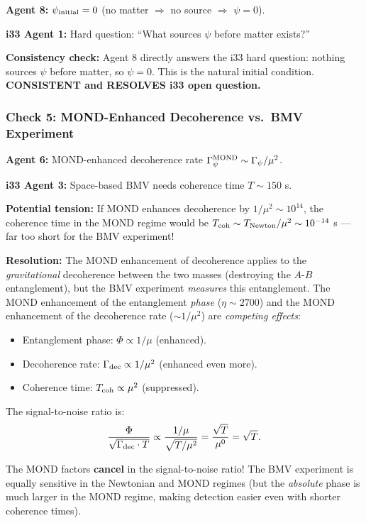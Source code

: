 \documentclass[11pt,a4paper]{article}
\begin{document}
\textbf{Agent 8:} $\psi_{\rm initial} = 0$ (no matter $\Rightarrow$ no source $\Rightarrow$ $\psi = 0$).

\textbf{i33 Agent 1:} Hard question: ``What sources $\psi$ before matter exists?''

\textbf{Consistency check:} Agent 8 directly answers the i33 hard question: nothing sources $\psi$ before matter, so $\psi = 0$. This is the natural initial condition. \textcolor{dfdgreen}{\textbf{CONSISTENT and RESOLVES i33 open question.}}

\subsubsection{Check 5: MOND-Enhanced Decoherence vs.\ BMV Experiment}

\textbf{Agent 6:} MOND-enhanced decoherence rate $\Gamma_\psi^{\rm MOND} \sim \Gamma_\psi/\mu^2$.

\textbf{i33 Agent 3:} Space-based BMV needs coherence time $T \sim 150$ s.

\textbf{Potential tension:} If MOND enhances decoherence by $1/\mu^2 \sim 10^{14}$, the coherence time in the MOND regime would be $T_{\rm coh} \sim T_{\rm Newton}/\mu^2 \sim 10^{-14}$ s --- far too short for the BMV experiment!

\textbf{Resolution:} The MOND enhancement of decoherence applies to the \emph{gravitational} decoherence between the two masses (destroying the $A$-$B$ entanglement), but the BMV experiment \emph{measures} this entanglement. The MOND enhancement of the entanglement \emph{phase} ($\eta \sim 2700$) and the MOND enhancement of the decoherence rate ($\sim 1/\mu^2$) are \emph{competing effects}:
\begin{itemize}
\item Entanglement phase: $\Phi \propto 1/\mu$ (enhanced).
\item Decoherence rate: $\Gamma_{\rm dec} \propto 1/\mu^2$ (enhanced even more).
\item Coherence time: $T_{\rm coh} \propto \mu^2$ (suppressed).
\end{itemize}

The signal-to-noise ratio is:
\begin{equation}
\frac{\Phi}{\sqrt{\Gamma_{\rm dec}\cdot T}} \propto \frac{1/\mu}{\sqrt{T/\mu^2}} = \frac{\sqrt{T}}{\mu^0} = \sqrt{T}.
\end{equation}

The MOND factors \textbf{cancel} in the signal-to-noise ratio! The BMV experiment is equally sensitive in the Newtonian and MOND regimes (but the \emph{absolute} phase is much larger in the MOND regime, making detection easier even with shorter coherence times).
\end{document}
